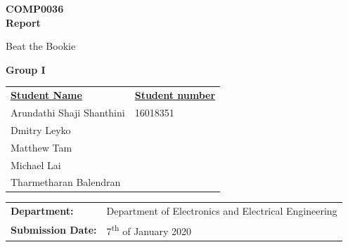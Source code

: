 \documentclass[a4paper,12pt]{article}
\begin{document}
	\begin{titlepage}
		\setlength{\voffset}{-1.5in}
		\noindent {}
			
			\vspace{15mm}
			
			\begin{center}
				{\Huge \textbf{COMP0036 \\ \vspace{10mm} Report}}
			
				\vspace{8mm}
			
				\begin{spacing}{1.8}
					{\huge Beat the Bookie}
				\end{spacing}
		
			
				\vspace{12mm}
			
				{\LARGE \textbf{Group I}}
				
				\vspace{10mm}
				
				\begin{tabular}{ll}
					\underline{\textbf{Student Name}}  & \hspace{4mm} \underline{\textbf{Student number}} \vspace{2mm} \\
					Arundathi Shaji Shanthini & \hspace{4mm} 16018351 \\ 
					Dmitry Leyko & \hspace{4mm}  \\ 
					Matthew Tam & \hspace{4mm}  \\ 
					Michael Lai & \hspace{4mm} \\ 
					Tharmetharan Balendran & \hspace{4mm} \\ 
				\end{tabular}
				
				\vspace{13mm}
				
				\begin{tabular}{ll}
					\textbf{Department:} &  Department of Electronics and Electrical Engineering\\ \vspace{3mm}
					\textbf{Submission Date:} &  7\textsuperscript{th} of January 2020
				\end{tabular}
			\end{center}
	\end{titlepage}
	
\end{document}

